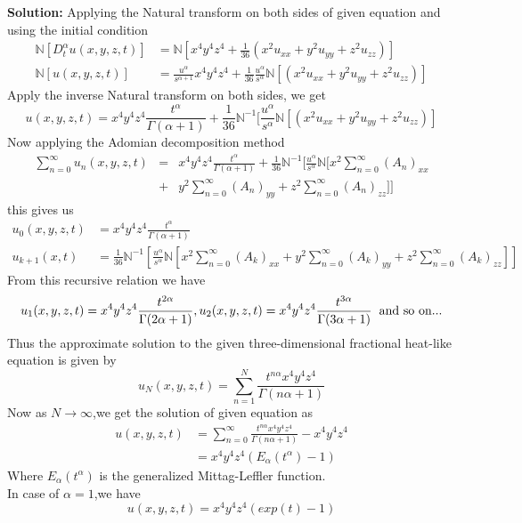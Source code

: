 \textbf{Solution:}
Applying the Natural transform on both sides of given equation and using the initial condition
\begin{align*}
\mathbb{N}[D_{t}^{\alpha}u(x,y,z,t)]&=\mathbb{N}[x^{4}y^{4}z^{4}+\frac{1}{36}(x^{2}u_{xx}+y^{2}u_{yy}+z^{2}u_{zz})]\\
\mathbb{N}[u(x,y,z,t)]&=\frac{u^{\alpha}}{s^{\alpha+1}}x^{4}y^{4}z^{4}+\frac{1}{36}\frac{u^{\alpha}}{s^{\alpha}}\mathbb{N}[(x^{2}u_{xx}+y^{2}u_{yy}+z^{2}u_{zz})]
\end{align*}
Apply the inverse Natural transform on both sides, we get
\begin{equation*}
u(x,y,z,t)=x^{4}y^{4}z^{4}\frac{t^{\alpha}}{\Gamma(\alpha+1)}+\frac{1}{36}\mathbb{N}^{-1}[\frac{u^{\alpha}}{s^{\alpha}}\mathbb{N}[(x^{2}u_{xx}+y^{2}u_{yy}+z^{2}u_{zz})]
\end{equation*}
Now applying the Adomian decomposition method
\begin{eqnarray}
\sum_{n=0}^{\infty}u_{n}(x,y,z,t)&=&x^{4}y^{4}z^{4}\frac{t^{\alpha}}{\Gamma(\alpha+1)}+\frac{1}{36}\mathbb{N}^{-1}[\frac{u^{\alpha}}{s^{\alpha}}\mathbb{N}[x^{2}\sum_{n=0}^{\infty}(A_{n})_{xx}\\
&+&y^{2}\sum_{n=0}^{\infty}(A_{n})_{yy}+z^{2}\sum_{n=0}^{\infty}(A_{n})_{zz}]]
\end{eqnarray}
this gives us
\begin{align*}
u_{0}(x,y,z,t)&=x^{4}y^{4}z^{4}\frac{t^{\alpha}}{\Gamma(\alpha+1)}\\
u_{k+1}(x,t)&=\frac{1}{36}\mathbb{N}^{-1}[\frac{u^{\alpha}}{s^{\alpha}}\mathbb{N}[x^{2}\sum_{n=0}^{\infty}(A_{k})_{xx}+y^{2}\sum_{n=0}^{\infty}(A_{k})_{yy}+z^{2}\sum_{n=0}^{\infty}(A_{k})_{zz}]]
\end{align*}
From this recursive relation we have 
\begin{equation*}
u_{1}(x,y,z,t)=x^{4}y^{4}z^{4}\frac{t^{2\alpha}}{\Gamma(2\alpha+1)},u_{2}(x,y,z,t)=x^{4}y^{4}z^{4}\frac{t^{3\alpha}}{\Gamma(3\alpha+1)}\hspace*{0.2cm} \text{and so on...}
\end{equation*}
Thus the approximate solution to the given three-dimensional fractional heat-like equation is given by\\
\begin{equation}
u_{N}(x,y,z,t)=\sum_{n=1}^{N}\frac{t^{n\alpha}x^{4}y^{4}z^{4}}{\Gamma(n\alpha+1)}
\end{equation}
Now as $ N\rightarrow \infty $,we get the solution of given equation as\\
\begin{align*}
u(x,y,z,t)&=\sum_{n=0}^{\infty}\frac{t^{n\alpha}x^{4}y^{4}z^{4}}{\Gamma(n\alpha+1)}-x^{4}y^{4}z^{4}\\
&=x^{4}y^{4}z^{4}(E_{\alpha}(t^{\alpha})-1)
\end{align*}
Where $ E_{\alpha}(t^{\alpha}) $ is the generalized Mittag-Leffler function.\\
In case of $ \alpha=1 $,we have
\begin{equation}
u(x,y,z,t)=x^{4}y^{4}z^{4}(exp(t)-1)
\end{equation}

